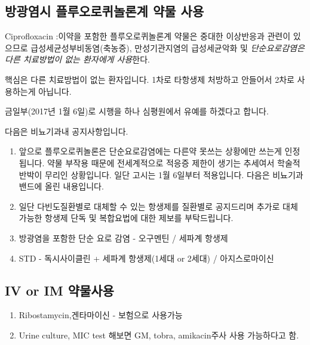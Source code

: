\subsection{방광염시 플루오로퀴놀론계 약물 사용}
Ciprofloxacin :이약을 포함한 플루오로퀴놀론계 약물은 중대한 이상반응과 관련이 있으므로 급성세균성부비동염(축농증), 만성기관지염의 급성세균악화 및 \emph{단순요로감염은 다른 치료방법이 없는 환자에게 사용}한다.\par
핵심은 다른 치료방법이 없는 환자입니다. 1차로 타항생제 처방하고 안들어서 2차로 사용하는게 아닙니다.\par
금일부(2017년 1월 6일)로 시행을 하나 심평원에서 유예를 하겠다고 합니다.\par
다음은 비뇨기과내 공지사항입니다.
\begin{enumerate}\tightlist
\item 앞으로 플루오로퀴놀론은 단순요로감염에는 다른약 못쓰는 상황에만 쓰는게 인정됩니다. 약물 부작용 때문에 전세계적으로 적응증 제한이 생기는 추세여서 학술적 반박이 무리인 상황입니다. 일단 고시는 1월 6일부터 적용입니다.
다음은 비뇨기과밴드에 올린 내용입니다.
\item 일단 다빈도질환별로 대체할 수 있는 항생제를 질환별로 공지드리며 추가로 대체 가능한 항생제 단독 및 복합요법에 대한 제보를 부탁드립니다.
\item 방광염을 포함한 단순 요로 감염   - 오구멘틴 / 세파계 항생제
\item STD   - 독시사이클린 + 세파계 항생제(1세대 or 2세대) / 아지스로마이신
\end{enumerate}

\subsection{IV or IM 약물사용}
\begin{enumerate}\tightlist
\item Ribostamycin,겐타마이신 - 보험으로 사용가능
\item Urine culture, MIC test 해보면 GM, tobra, amikacin주사 사용 가능하다고 함.
\end{enumerate}

